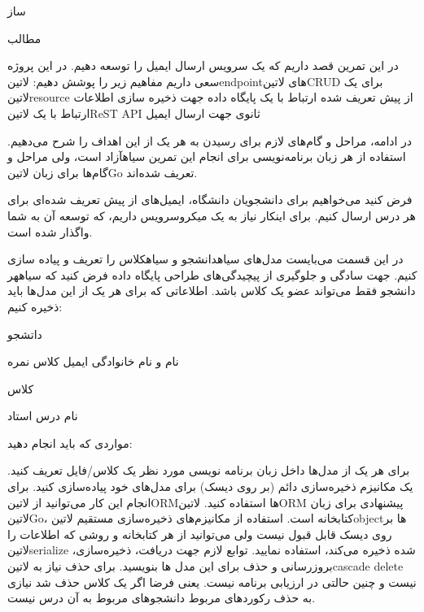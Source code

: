 \documentclass{../assignment}
\begin{document}
‌ساز

‌مطالب


در این تمرین قصد داریم که یک سرویس ارسال ایمیل را توسعه دهیم. در این پروژه سعی داریم مفاهیم زیر را پوشش دهیم:
 ‌لاتین{endpoint}های ‌لاتین{CRUD} برای یک ‌لاتین{resource} از پیش تعریف شده
 ارتباط با یک پایگاه داده جهت ذخیره سازی اطلاعات
 ارتباط با یک ‌لاتین{ReST API} ثانوی جهت ارسال ایمیل

در ادامه، مراحل و گام‌های لازم برای رسیدن به هر یک از این اهداف را شرح می‌دهیم.
استفاده از هر زبان برنامه‌نویسی برای انجام این تمرین ‌سیاه{آزاد} است، ولی مراحل و گام‌ها برای زبان ‌لاتین{Go} تعریف شده‌اند.


فرض کنید می‌خواهیم برای دانشجویان دانشگاه، ایمیل‌های از پیش تعریف شده‌ای برای هر درس ارسال کنیم.
برای اینکار نیاز به یک میکروسرویس داریم، که توسعه آن به شما واگذار شده است.


در این قسمت می‌بایست مدل‌های ‌سیاه{دانشجو} و ‌سیاه{کلاس} را تعریف و پیاده سازی کنیم.
جهت سادگی و جلوگیری از پیچیدگی‌های طراحی پایگاه داده فرض کنید که ‌سیاه{هر دانشجو فقط می‌تواند عضو یک کلاس باشد}.
اطلاعاتی که برای هر یک از این مدل‌ها باید ذخیره کنیم:


 داتشجو

 نام و نام خانوادگی
 ایمیل
 کلاس
 نمره

 کلاس

 نام درس
 استاد


مواردی که باید انجام دهید:


 برای هر یک از مدل‌ها داخل زبان برنامه نویسی مورد نظر یک کلاس/فایل تعریف کنید.
 یک مکانیزم ذخیره‌سازی دائم (بر روی دیسک) برای مدل‌های خود پیاده‌سازی کنید.
 برای انجام این کار می‌توانید از ‌لاتین{ORM}ها استفاده کنید. ‌لاتین{ORM} پیشنهادی برای زبان ‌لاتین{Go}، کتابخانه  است.
 استفاده از مکانیزم‌های ذخیره‌سازی مستقیم ‌لاتین{object}ها بر روی دیسک قابل قبول نیست ولی می‌توانید از هر کتابخانه و روشی که اطلاعات را ‌لاتین{serialize} شده ذخیره می‌کند، استفاده نمایید.
 توابع لازم جهت دریافت، ذخیره‌سازی، بروزرسانی و حذف برای این مدل ها بنویسید.
 برای حذف نیاز به ‌لاتین{cascade delete} نیست و چنین حالتی در ارزیابی برنامه نیست. یعنی فرضا اگر یک کلاس حذف شد نیازی به حذف رکوردهای مربوط دانشجوهای مربوط به آن درس نیست.
\end{document}
